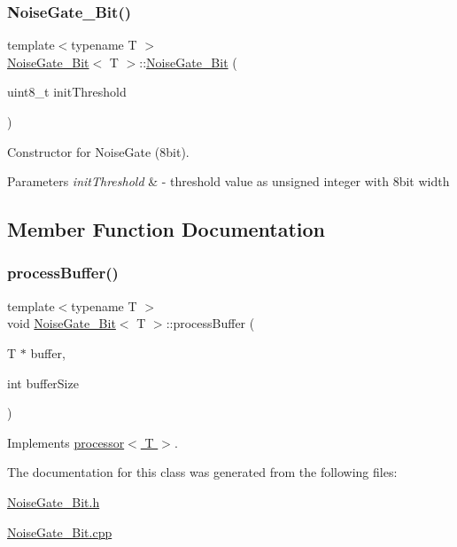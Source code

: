 \subsubsection{\texorpdfstring{Noise\+Gate\+\_\+Bit()}{NoiseGate\_8Bit()}}
{\footnotesize\ttfamily template$<$typename T $>$ \\
\hyperlink{classNoiseGate__8Bit}{Noise\+Gate\+\_\+Bit}$<$ T $>$\+::\hyperlink{classNoiseGate__8Bit}{Noise\+Gate\+\_\+Bit} (\begin{DoxyParamCaption}\item[{uint8\+\_\+t}]{init\+Threshold }\end{DoxyParamCaption})}

Constructor for Noise\+Gate (8bit). 
\begin{DoxyParams}{Parameters}
{\em init\+Threshold} & -\/ threshold value as unsigned integer with 8bit width \\
\hline
\end{DoxyParams}


\subsection{Member Function Documentation}
\mbox{\label{classNoiseGate__8Bit_a76df76db3661572eb4f96bf7094df31b}} 
\subsubsection{\texorpdfstring{process\+Buffer()}{processBuffer()}}
{\footnotesize\ttfamily template$<$typename T $>$ \\
void \hyperlink{classNoiseGate__8Bit}{Noise\+Gate\+\_\+Bit}$<$ T $>$\+::process\+Buffer (\begin{DoxyParamCaption}\item[{T $\ast$}]{buffer,  }\item[{int}]{buffer\+Size }\end{DoxyParamCaption})\hspace{0.3cm}{\ttfamily [virtual]}}



Implements \hyperlink{classprocessor_ab23d53c7dd927e50108272ee007dcc29}{processor$<$ T $>$}.



The documentation for this class was generated from the following files\+:\begin{DoxyCompactItemize}
\item 
\hyperlink{NoiseGate__8Bit_8h}{Noise\+Gate\+\_\+Bit.\+h}\item 
\hyperlink{NoiseGate__8Bit_8cpp}{Noise\+Gate\+\_\+Bit.\+cpp}\end{DoxyCompactItemize}
